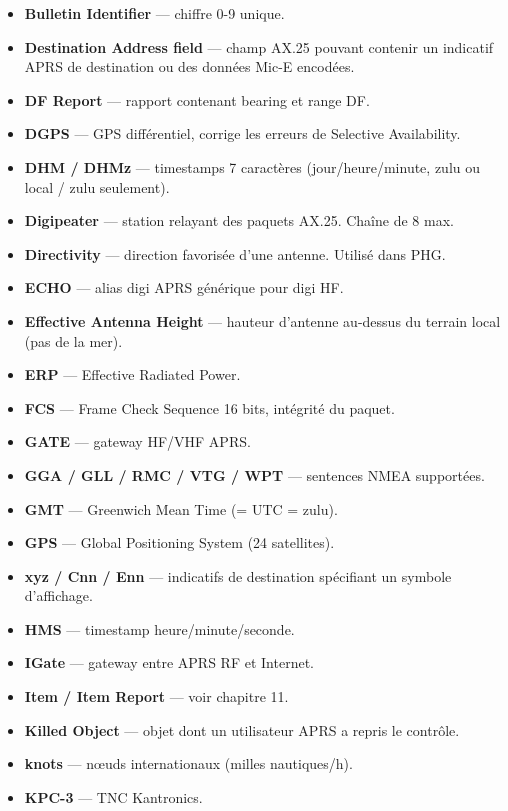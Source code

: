 {\begin{itemize}
  quelques heures.
\item
  \textbf{Bulletin Identifier} --- chiffre 0-9 unique.
\item
  \textbf{Destination Address field} --- champ AX.25 pouvant contenir un
  indicatif APRS de destination ou des données Mic-E encodées.
\item
  \textbf{DF Report} --- rapport contenant bearing et range DF.
\item
  \textbf{DGPS} --- GPS différentiel, corrige les erreurs de Selective
  Availability.
\item
  \textbf{DHM / DHMz} --- timestamps 7 caractères (jour/heure/minute,
  zulu ou local / zulu seulement).
\item
  \textbf{Digipeater} --- station relayant des paquets AX.25. Chaîne de
  8 max.
\item
  \textbf{Directivity} --- direction favorisée d'une antenne. Utilisé
  dans PHG.
\item
  \textbf{ECHO} --- alias digi APRS générique pour digi HF.
\item
  \textbf{Effective Antenna Height} --- hauteur d'antenne au-dessus du
  terrain local (pas de la mer).
\item
  \textbf{ERP} --- Effective Radiated Power.
\item
  \textbf{FCS} --- Frame Check Sequence 16 bits, intégrité du paquet.
\item
  \textbf{GATE} --- gateway HF/VHF APRS.
\item
  \textbf{GGA / GLL / RMC / VTG / WPT} --- sentences NMEA supportées.
\item
  \textbf{GMT} --- Greenwich Mean Time (= UTC = zulu).
\item
  \textbf{GPS} --- Global Positioning System (24 satellites).
\item
  \textbf{{\ttfamily {}xyz / Cnn / Enn}} --- indicatifs de destination
  spécifiant un symbole d'affichage.
\item
  \textbf{HMS} --- timestamp heure/minute/seconde.
\item
  \textbf{IGate} --- gateway entre APRS RF et Internet.
\item
  \textbf{Item / Item Report} --- voir chapitre 11.
\item
  \textbf{Killed Object} --- objet dont un utilisateur APRS a repris le
  contrôle.
\item
  \textbf{knots} --- nœuds internationaux (milles nautiques/h).
\item
  \textbf{KPC-3} --- TNC Kantronics.

\end{itemize}}
